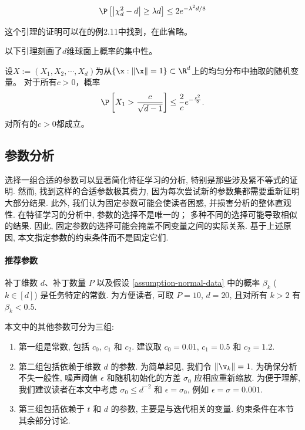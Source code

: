 \begin{lemma}[卡方随机变量的集中不等式]\label{lemma-chi-square-concentration-inequality}
    \begin{equation}
        \P \left[ \left| \chi_d^2 - d \right| \geq \lambda d \right] \leq 2 e^{-\lambda^2 d/8}
    \end{equation}
\end{lemma}
这个引理的证明可以在\cite{wainwright_2019}的例2.11中找到，在此省略。

以下引理刻画了$d$维球面上概率的集中性。
\begin{lemma}\label{lemma-high-dimensional-space}
设$X := (X_1, X_2, \cdots, X_d)$为从$\{\x : \|\x\| = 1 \} \subset \R^d$上的均匀分布中抽取的随机变量。
对于所有$ c > 0$，概率
\begin{equation}
    \P\left[ X_1 > \frac{c}{\sqrt{d-1}} \right] \leq \frac{2}{c} e^{-\frac{c^2}{2}}.
\end{equation}
对所有的$ c > 0$都成立。
\end{lemma}

\subsection{参数分析}\label{sec-parameters}
选择一组合适的参数可以显著简化特征学习的分析, 特别是那些涉及紧不等式的证明. 
然而, 找到这样的合适参数极其费力, 因为每次尝试新的参数集都需要重新证明大部分结果. 
此外, 我们认为固定参数可能会使读者困惑, 并损害分析的整体直观性. 
在特征学习的分析中, 参数的选择不是唯一的； 
多种不同的选择可能导致相似的结果. 
因此, 固定参数的选择可能会掩盖不同变量之间的实际关系. 
基于上述原因, 本文指定参数的约束条件而不是固定它们. 

\paragraph{推荐参数}
补丁维数 $d$、补丁数量 $P$ 以及假设 \ref{assumption-normal-data} 中的概率 $\beta_k$ ($k\in [d]$) 是任务特定的常数. 
为方便读者, 可取 $P = 10$, $d = 20$, 且对所有 $k > 2$ 有 $\beta_k < 0.5$. 

本文中的其他参数可分为三组: 
\begin{enumerate}
    \item 第一组是常数, 包括 $c_0$, $c_1$ 和 $c_2$. 建议取 $c_0 = 0.01$, $c_1 = 0.5$ 和 $c_2 = 1.2$. 
    \item 第二组包括依赖于维数 $d$ 的参数. 
    为简单起见, 我们令 $\|\v_k\|=1$. 
    为确保分析不失一般性, {噪声阈值} $\epsilon$ 和随机初始化的方差 $\sigma_0$ 应相应重新缩放. 
    为便于理解, 我们建议读者在本文中考虑 $\sigma_0 \leq d^{-2}$ 和 $\epsilon = \sigma_0$, 例如 $\epsilon = \sigma = 0.001$. 
    \item 第三组包括依赖于 $t$ 和 $d$ 的参数, 主要是与迭代相关的变量. 约束条件在本节其余部分讨论. 
\end{enumerate}

